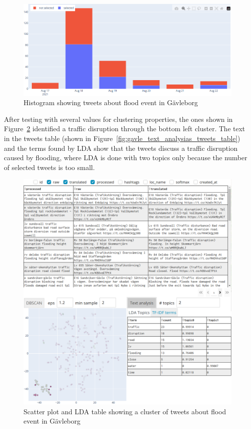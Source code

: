\begin{figure}[H]
  \begin{center}
    \includegraphics[width=14cm]{./images/gavle_histogram.png}
  \end{center}
  \caption{Histogram showing tweets about flood event in Gävleborg}
  \label{fig:gavle_histogram}
\end{figure}


After testing with several values for clustering properties, the ones shown in
Figure~\ref{fig:gavle_text_analysis_scatter_tables} identified a traffic disruption through the
bottom left cluster. The text in the tweets table (shown in
Figure~\ref{fig:gavle_text_analysias_tweets_table}) and the terms found by \ac{LDA} show that the
tweets discuss a traffic disruption caused by flooding, where \ac{LDA} is done with two topics only
because the number of selected tweets is too small.

\begin{figure}[H]
  \begin{center}
    \includegraphics[width=\columnwidth, trim={0cm 0cm 0cm 14.5cm},clip]{./images/gavle_text_analysis.png}
  \end{center}
  \caption{Scatter plot and LDA table showing a cluster of tweets about flood event in Gävleborg}
  \label{fig:gavle_text_analysis_scatter_tables}
\end{figure}

